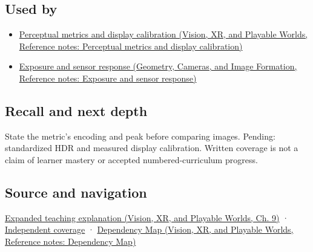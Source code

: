 \subsection{Used by}\label{appendix-a9f83ad40792-used-by}

\hypertarget{appendix-a9f83ad40792-used-by}{}

\begin{itemize}
\tightlist
\item
  \href{../07-Vision-XR-and-Playable-Worlds/main.pdf\#nameddest=appendix-b2c1846508bf}{Perceptual metrics and display calibration (Vision, XR, and Playable Worlds, Reference notes: Perceptual metrics and display calibration)}
\item
  \href{../03-Geometry-Cameras-and-Image-Formation/main.pdf\#nameddest=appendix-92d45cdf2afc}{Exposure and sensor response (Geometry, Cameras, and Image Formation, Reference notes: Exposure and sensor response)}
\end{itemize}

\subsection{Recall and next depth}\label{appendix-a9f83ad40792-recall-and-next-depth}

\hypertarget{appendix-a9f83ad40792-recall-and-next-depth}{}

State the metric's encoding and peak before comparing images. Pending: standardized HDR and measured display calibration. Written coverage is not a claim of learner mastery or accepted numbered-curriculum progress.

\subsection{Source and navigation}\label{appendix-a9f83ad40792-source-and-navigation}

\hypertarget{appendix-a9f83ad40792-source-and-navigation}{}

\href{../07-Vision-XR-and-Playable-Worlds/main.pdf\#nameddest=04-visual-computing-ii-ch042-encoded-rgb-must-not-masquerade-as-linear-light}{Expanded teaching explanation (Vision, XR, and Playable Worlds, Ch. 9)} · \hyperref[appendix-fd090d982a15-xr01---independent-seeing-and-representation-source]{Independent coverage} · \href{../07-Vision-XR-and-Playable-Worlds/main.pdf\#nameddest=appendix-4ad47bdd269a}{Dependency Map (Vision, XR, and Playable Worlds, Reference notes: Dependency Map)}

